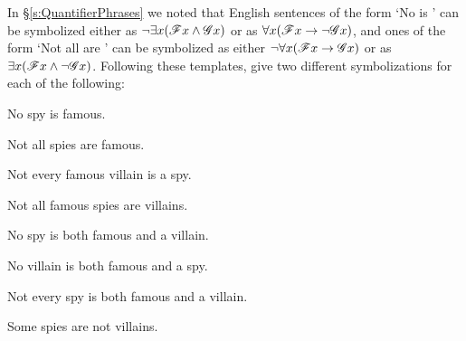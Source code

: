 

\problempart
In \S\ref{s:QuantifierPhrases} we noted that English sentences of the form `No  is ' can be symbolized either as $\neg \exists x (\mathscr{F}x \wedge \mathscr{G}x)$ or as $\forall x(\mathscr{F}x \rightarrow \neg \mathscr{G}x)$, and ones of the form `Not all  are ' can be symbolized as either $\neg \forall x(\mathscr{F}x \rightarrow \mathscr{G}x)$ or as $\exists x(\mathscr{F}x \wedge \neg \mathscr{G}x)$.  Following these templates, give two different symbolizations for each of the following:

\begin{earg}
\item No spy is famous.
\item Not all spies are famous.
\item Not every famous villain is a spy.
\item Not all famous spies are villains.
\item No spy is both famous and a villain.
\item No villain is both famous and a spy.
\item Not every spy is both famous and a villain.
\item Some spies are not villains.
\end{earg}


